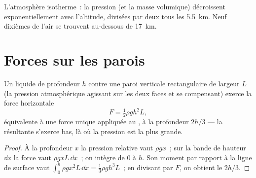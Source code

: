\begin{omfigure}

{\small L'atmosphère isotherme~: la pression (et la masse volumique)
décroissent exponentiellement avec l'altitude, divisées par deux tous les
\qty{5.5}{km}. Neuf dixièmes de l'air se trouvent au-dessous de \qty{17}{km}.}
\end{omfigure}

\section{Forces sur les parois}

\begin{proposition}\label{prop:b1:fluid-statics:wall}
Un liquide de profondeur $h$ contre une paroi verticale rectangulaire de
largeur $L$ (la pression atmosphérique agissant sur les deux faces et se
compensant) exerce la force horizontale
\[
F = \tfrac12\rho gh^2L ,
\]
équivalente à une force unique appliquée au \emph{}, à
la profondeur $2h/3$ --- la résultante s'exerce bas, là où la pression est
la plus grande.
\end{proposition}

\begin{proof}
À la profondeur $x$ la pression relative vaut $\rho gx$~; sur la bande de
hauteur $\dd x$ la force vaut $\rho gxL\,\dd x$~; on intègre de $0$ à $h$. Son
moment par rapport à la ligne de surface vaut $\int_0^h\rho gx^2L\,\dd x = \tfrac13\rho gh^3L$~;
en divisant par $F$, on obtient le  $2h/3$.
\end{proof}

